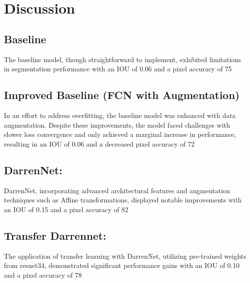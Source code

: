 \section*{Discussion}

\subsection*{Baseline}
The baseline model, though straightforward to implement, exhibited limitations in segmentation performance with an IOU of 0.06 and a pixel accuracy of 75%

\subsection*{Improved Baseline (FCN with Augmentation)}
In an effort to address overfitting, the baseline model was enhanced with data augmentation. Despite these improvements, the model faced challenges with slower loss convergence and only achieved a marginal increase in performance, resulting in an IOU of 0.06 and a decreased pixel accuracy of 72%

\subsection*{DarrenNet:}
DarrenNet, incorporating advanced architectural features and augmentation techniques such as Affine transformations, displayed notable improvements with an IOU of 0.15 and a pixel accuracy of 82%

\subsection*{Transfer Darrennet:}
The application of transfer learning with DarrenNet, utilizing pre-trained weights from resnet34, demonstrated significant performance gains with an IOU of 0.10 and a pixel accuracy of 78%

